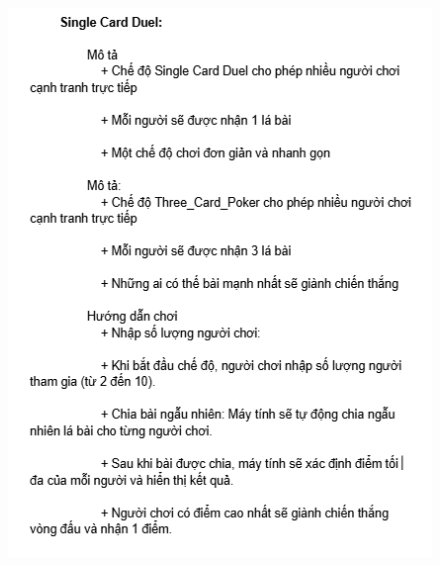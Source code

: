 \documentclass{article}
\begin{document}
    \begin{figure}
        \centering
        \includegraphics[width=1\textwidth]{images/screenshot/4_a_8.png}
    \end{figure}
\end{document}
